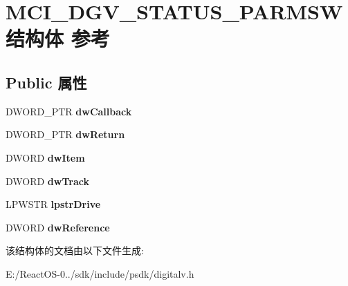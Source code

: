 \hypertarget{struct_m_c_i___d_g_v___s_t_a_t_u_s___p_a_r_m_s_w}{}\section{M\+C\+I\+\_\+\+D\+G\+V\+\_\+\+S\+T\+A\+T\+U\+S\+\_\+\+P\+A\+R\+M\+S\+W结构体 参考}
\label{struct_m_c_i___d_g_v___s_t_a_t_u_s___p_a_r_m_s_w}
\subsection*{Public 属性}
\begin{DoxyCompactItemize}
\item 
\mbox{\label{struct_m_c_i___d_g_v___s_t_a_t_u_s___p_a_r_m_s_w_a2bf0c3dbc62a3f4770fb1966d27aa3b0}} 
D\+W\+O\+R\+D\+\_\+\+P\+TR {\bfseries dw\+Callback}
\item 
\mbox{\label{struct_m_c_i___d_g_v___s_t_a_t_u_s___p_a_r_m_s_w_a21a39bd32d28619b2b3171d2c9e15909}} 
D\+W\+O\+R\+D\+\_\+\+P\+TR {\bfseries dw\+Return}
\item 
\mbox{\label{struct_m_c_i___d_g_v___s_t_a_t_u_s___p_a_r_m_s_w_a5c2284f2a83666eadbe4b38bf4454a4e}} 
D\+W\+O\+RD {\bfseries dw\+Item}
\item 
\mbox{\label{struct_m_c_i___d_g_v___s_t_a_t_u_s___p_a_r_m_s_w_a5f0497bc5d1c45cc2c62e66c48a79faa}} 
D\+W\+O\+RD {\bfseries dw\+Track}
\item 
\mbox{\label{struct_m_c_i___d_g_v___s_t_a_t_u_s___p_a_r_m_s_w_a9125c67d29740a13fedf29a3f6970b99}} 
L\+P\+W\+S\+TR {\bfseries lpstr\+Drive}
\item 
\mbox{\label{struct_m_c_i___d_g_v___s_t_a_t_u_s___p_a_r_m_s_w_a5b1dda425b49a35bc7399f541014b5a3}} 
D\+W\+O\+RD {\bfseries dw\+Reference}
\end{DoxyCompactItemize}


该结构体的文档由以下文件生成\+:\begin{DoxyCompactItemize}
\item 
E\+:/\+React\+O\+S-\/0../sdk/include/psdk/digitalv.\+h\end{DoxyCompactItemize}
